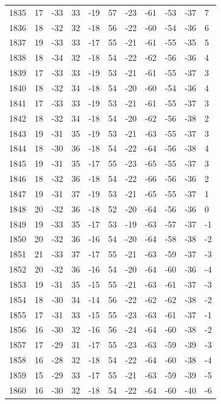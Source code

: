\begin{table}[H]
\begin{tabular}{lllllllllll}
1835 & 17 & -33 & 33 & -19 & 57 & -23 & -61 & -53 & -37 & 7 \\
1836 & 18 & -32 & 32 & -18 & 56 & -22 & -60 & -54 & -36 & 6 \\
1837 & 19 & -33 & 33 & -17 & 55 & -21 & -61 & -55 & -35 & 5 \\
1838 & 18 & -34 & 32 & -18 & 54 & -22 & -62 & -56 & -36 & 4 \\
1839 & 17 & -33 & 33 & -19 & 53 & -21 & -61 & -55 & -37 & 3 \\
1840 & 18 & -32 & 34 & -18 & 54 & -20 & -60 & -54 & -36 & 4 \\
1841 & 17 & -33 & 33 & -19 & 53 & -21 & -61 & -55 & -37 & 3 \\
1842 & 18 & -32 & 34 & -18 & 54 & -20 & -62 & -56 & -38 & 2 \\
1843 & 19 & -31 & 35 & -19 & 53 & -21 & -63 & -55 & -37 & 3 \\
1844 & 18 & -30 & 36 & -18 & 54 & -22 & -64 & -56 & -38 & 4 \\
1845 & 19 & -31 & 35 & -17 & 55 & -23 & -65 & -55 & -37 & 3 \\
1846 & 18 & -32 & 36 & -18 & 54 & -22 & -66 & -56 & -36 & 2 \\
1847 & 19 & -31 & 37 & -19 & 53 & -21 & -65 & -55 & -37 & 1 \\
1848 & 20 & -32 & 36 & -18 & 52 & -20 & -64 & -56 & -36 & 0 \\
1849 & 19 & -33 & 35 & -17 & 53 & -19 & -63 & -57 & -37 & -1 \\
1850 & 20 & -32 & 36 & -16 & 54 & -20 & -64 & -58 & -38 & -2 \\
1851 & 21 & -33 & 37 & -17 & 55 & -21 & -63 & -59 & -37 & -3 \\
1852 & 20 & -32 & 36 & -16 & 54 & -20 & -64 & -60 & -36 & -4 \\
1853 & 19 & -31 & 35 & -15 & 55 & -21 & -63 & -61 & -37 & -3 \\
1854 & 18 & -30 & 34 & -14 & 56 & -22 & -62 & -62 & -38 & -2 \\
1855 & 17 & -31 & 33 & -15 & 55 & -23 & -63 & -61 & -37 & -1 \\
1856 & 16 & -30 & 32 & -16 & 56 & -24 & -64 & -60 & -38 & -2 \\
1857 & 17 & -29 & 31 & -17 & 55 & -23 & -63 & -59 & -39 & -3 \\
1858 & 16 & -28 & 32 & -18 & 54 & -22 & -64 & -60 & -38 & -4 \\
1859 & 15 & -29 & 33 & -17 & 55 & -21 & -63 & -59 & -39 & -5 \\
1860 & 16 & -30 & 32 & -18 & 54 & -22 & -64 & -60 & -40 & -6 \\

\end{tabular}
\end{table}
